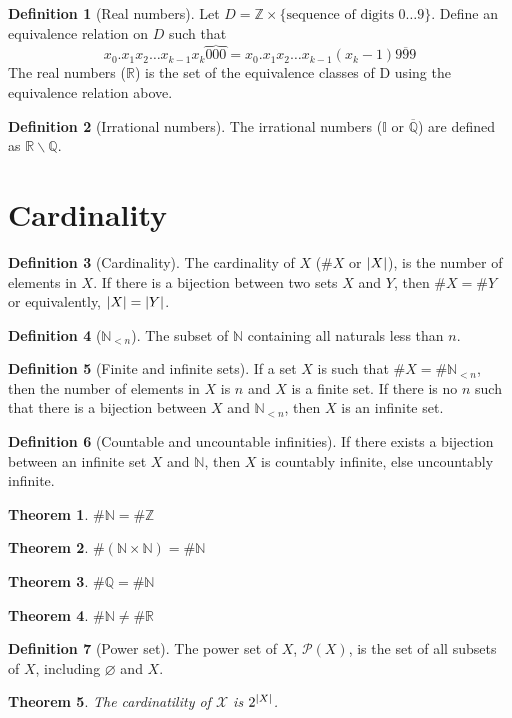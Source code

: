 \documentclass{article}
\newcommand*{\N}{\mathbb{N}}
\newcommand*{\Z}{\mathbb{Z}}
\newcommand*{\Q}{\mathbb{Q}}
\newcommand*{\I}{\mathbb{I}}
\newcommand*{\R}{\mathbb{R}}
\let\emptyset\varnothing
\theoremstyle{plain}
\newtheorem{theorem}{Theorem}[section]
\numberwithin{theorem}{subsection}
\theoremstyle{definition}
\newtheorem{definition}{Definition}[section]
\numberwithin{definition}{subsection}
\theoremstyle{remark}
\numberwithin{note}{section}
\begin{document}
%
\begin{definition}[Real numbers]
    Let $D = \Z \times \{\text{sequence of digits $0\ldots 9$}\}$.
    Define an equivalence relation on $D$ such that
    \begin{equation*}
		x_0 . x_1 x_2 \dots x_{k-1} x_k \overbrace{000} = x_0 . x_1 x_2 \dots x_{k-1} \left(x_k - 1\right)\overbar{999}
	\end{equation*}
    The real numbers ($\R$) is the set of the equivalence classes of D using the equivalence relation above.
\end{definition}
%
\begin{definition}[Irrational numbers]
    The irrational numbers ($\I$ or $\overline{\Q}$) are defined as $\R\backslash\Q$.
\end{definition}
%
\section{Cardinality}
\begin{definition}[Cardinality]
    The cardinality of $X$ ($\#X$ or $\abs{X}$), is the number of elements in $X$.
    If there is a bijection between two sets $X$ and $Y$,
    then $\#X=\#Y$ or equivalently, $\abs{X} = \abs{Y}$.
\end{definition}
%
\begin{definition}[$\N_{<n}$]
    The subset of $\N$ containing all naturals less than $n$.
\end{definition}
%
\begin{definition}[Finite and infinite sets]
    If a set $X$ is such that $\#X=\#\N_{<n}$,
    then the number of elements in $X$ is $n$ and $X$ is a finite set.
    If there is no $n$ such that there is a bijection between $X$ and $\N_{<n}$,
    then $X$ is an infinite set.
\end{definition}
%
\begin{definition}[Countable and uncountable infinities]
    If there exists a bijection between an infinite set $X$ and $\N$,
    then $X$ is countably infinite, else uncountably infinite.
\end{definition}
%
\begin{theorem}$\#\N = \#\Z$\end{theorem}
\begin{theorem}$\#(\N\times\N) = \#\N$\end{theorem}
\begin{theorem}$\#\Q = \#\N$\end{theorem}
\begin{theorem}$\#\N \ne \#\R$\end{theorem}
%
\begin{definition}[Power set]
    The power set of $X$, $\mathscr{P}(X)$, is the set of all subsets of $X$,
    including $\emptyset$ and $X$.
\end{definition}
\begin{theorem}
	The cardinatility of $\mathscr{X}$ is $2^{\abs{X}}$.
\end{theorem}
%
\end{document}
